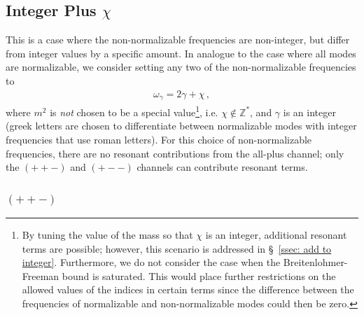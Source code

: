 \documentclass[letterpaper,11pt]{article}
\newcommand{\ogam}{\omega_\gamma}
\begin{document}
\subsection{Integer Plus $\chi$}

This is a case where the non-normalizable frequencies are non-integer, but differ from integer values by a specific amount. In analogue to the case where all modes are normalizable, we consider setting any two of the non-normalizable frequencies to
\begin{align}
\ogam = 2\gamma + \chi \, ,
\end{align}
where $m^2$ is \emph{not} chosen to be a special value\footnote{By tuning the value of the mass so that $\chi$ is an integer, additional resonant terms are possible; however, this scenario is addressed in \S\!~\ref{ssec: add to integer}. Furthermore, we do not consider the case when the Breitenlohmer-Freeman bound is saturated. This would place further restrictions on the allowed values of the indices in certain terms since the difference between the frequencies of normalizable and non-normalizable modes could then be zero.}, i.e. $\chi \notin \mathbb{Z}^*$, and $\gamma$ is an integer (greek letters are chosen to differentiate between normalizable modes with integer frequencies that use roman letters). For this choice of non-normalizable frequencies, there are no resonant contributions from the all-plus channel; only the $(++-)$ and $(+--)$ channels can contribute resonant terms.

\subsubsection{$(++-)$}
\end{document}
